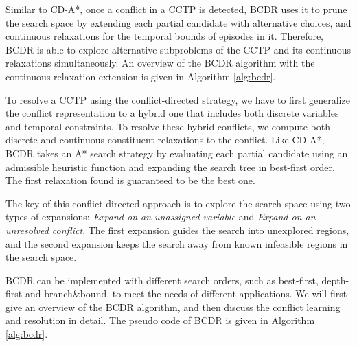 \documentclass[jair,twoside,11pt,theapa]{article}
\begin{document}
Similar to CD-A*, once a conflict in a CCTP is detected, BCDR uses it to prune
the search space by extending each partial candidate with alternative choices,
and continuous relaxations for the temporal bounds of episodes in it. Therefore,
BCDR is able to explore alternative subproblems of the CCTP and its continuous
relaxations simultaneously. An overview of the BCDR algorithm with the
continuous relaxation extension is given in Algorithm \ref{alg:bcdr}.


To resolve a CCTP using the conflict-directed strategy, we have to first
generalize the conflict representation to a hybrid one that includes both
discrete variables and temporal constraints. To resolve these hybrid conflicts,
we compute both discrete and continuous constituent relaxations to the
conflict. Like CD-A*, BCDR takes an A* search strategy by evaluating each
partial candidate using an admissible heuristic function and expanding the
search tree in best-first order. The first relaxation found is guaranteed to be
the best one.


The key of this conflict-directed approach is to explore the search space using
two types of expansions: \textit{Expand on an unassigned variable} and
\textit{Expand on an unresolved conflict}. The first expansion guides the search
into unexplored regions, and the second expansion keeps the search away from
known infeasible regions in the search space. 


%
%
%
%
%
%
%
%



BCDR can be implemented with
different search orders, such as best-first, depth-first and branch\&bound, to
meet the needs of different applications. We will first give an overview
of the BCDR algorithm, and then discuss the conflict learning and resolution in
detail. The pseudo code of BCDR is given in Algorithm \ref{alg:bcdr}.
	
\end{document}

